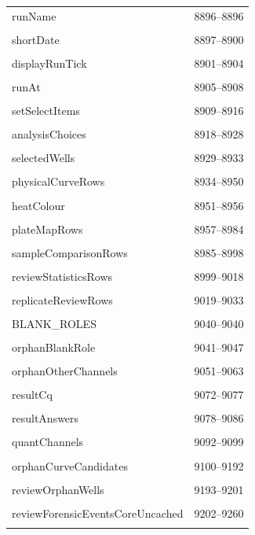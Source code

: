 {\begin{longtable}{@{}p{11cm}r@{}}
runName & 8896--8896 \\\\\hline
shortDate & 8897--8900 \\\\\hline
displayRunTick & 8901--8904 \\\\\hline
runAt & 8905--8908 \\\\\hline
setSelectItems & 8909--8916 \\\\\hline
analysisChoices & 8918--8928 \\\\\hline
selectedWells & 8929--8933 \\\\\hline
physicalCurveRows & 8934--8950 \\\\\hline
heatColour & 8951--8956 \\\\\hline
plateMapRows & 8957--8984 \\\\\hline
sampleComparisonRows & 8985--8998 \\\\\hline
reviewStatisticsRows & 8999--9018 \\\\\hline
replicateReviewRows & 9019--9033 \\\\\hline
BLANK\_ROLES & 9040--9040 \\\\\hline
orphanBlankRole & 9041--9047 \\\\\hline
orphanOtherChannels & 9051--9063 \\\\\hline
resultCq & 9072--9077 \\\\\hline
resultAnswers & 9078--9086 \\\\\hline
quantChannels & 9092--9099 \\\\\hline
orphanCurveCandidates & 9100--9192 \\\\\hline
reviewOrphanWells & 9193--9201 \\\\\hline
reviewForensicEventsCoreUncached & 9202--9260 \\\\\hline

\end{longtable}}
